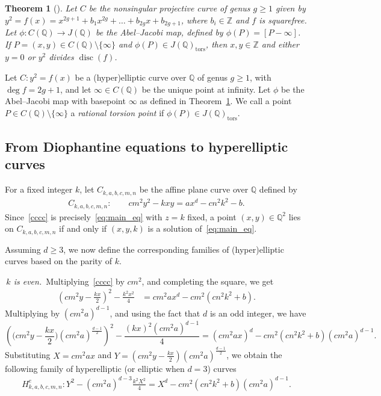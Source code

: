 \documentclass[11pt,a4paper]{amsart}
\newcommand{\ZZ}{\mathbb{Z}}
\newcommand{\Q}{\mathbb{Q}}
\theoremstyle{plain}
\newtheorem{theorem}{Theorem}[section]
\theoremstyle{definition}
\DeclareMathOperator{\disc}{disc}
\begin{document}
\begin{theorem}[{\cite[Theorem~3]{Grant}}] \label{thm:grant}
Let $C$ be the nonsingular projective curve of genus $g \ge 1$ given by $y^2 = f(x) = x^{2g+1} + b_1 x^{2g} + \dots + b_{2g} x + b_{2g+1}$, where $b_i \in \ZZ$ and $f$ is squarefree. Let
$\phi \colon C(\Q) \rightarrow J(\Q)$ be the Abel--Jacobi map, defined by $\phi(P) = [P - \infty]$. If $P = (x,y) \in C(\Q) \setminus \{\infty\}$ and
$\phi(P) \in J(\Q)_{\mathrm{tors}}$, then $x, y \in \ZZ$ and either $y = 0$ or $y^2$ divides $\disc(f)$. 
\end{theorem}

Let $C\colon y^2 = f(x)$ be a (hyper)elliptic curve over $\Q$ of genus $g \ge 1$, with $\deg f = 2g+1$, and let $\infty \in C(\Q)$ be the unique point at infinity. Let $\phi$ be the Abel--Jacobi map with basepoint $\infty$ as defined in Theorem~\ref{thm:grant}. We call a point $P \in C(\Q) \setminus \{\infty\}$ a \textit{rational torsion point} if $\phi(P) \in J(\Q)_{\mathrm{tors}}$. 

\subsection{From Diophantine equations to hyperelliptic curves}
For a fixed integer $k$, let $C_{k,a,b,c,m,n}$ be the affine plane
curve over $\Q$ defined by
\begin{align}\label{cccc}
  C_{k,a,b,c,m,n}:\qquad cm^2y^2 - kxy = ax^d - cn^2k^2 - b.
\end{align}
Since~\eqref{cccc} is precisely~\eqref{eq:main_eq} with $z=k$ fixed, a point $(x,y)\in\Q^2$ lies on $C_{k,a,b,c,m,n}$ if and only if $(x,y,k)$ is a solution of~\eqref{eq:main_eq}.


Assuming $d\ge3$, we now define the corresponding families of (hyper)elliptic curves based on the parity of $k$.

 \,\textit{$k$ is even.}\, 
 Multiplying~\eqref{cccc} by $cm^2$, and completing the square, we get    
 \begin{align*}
    \left(cm^2y - \frac{kx}{2}\right)^2 - \frac{k^2x^2}{4} &= cm^2ax^d - cm^2(cn^2k^2 + b).
\end{align*}
Multiplying by $(cm^2a)^{d-1}$, and using the fact that $d$ is an odd integer, we have
\begin{equation*}
    \left(\Big(cm^2y - \frac{kx}{2}\Big)(cm^2a)^{\frac{d-1}{2}}\right)^2 - \frac{(kx)^2(cm^2a)^{d-1}}{4} = (cm^2ax)^d - cm^2(cn^2k^2 + b)(cm^2a)^{d-1}.
\end{equation*}
Substituting $X = cm^2ax$ and $Y = \left(cm^2y - \frac{kx}{2}\right)(cm^2a)^{\frac{d-1}{2}}$, we obtain the following family of hyperelliptic (or elliptic when $d=3$) curves
\begin{align}\label{Hyperelliptic even}
    H_{k,a,b,c,m,n}^e : Y^2 - (cm^2a)^{d-3}\frac{k^2X^2}{4} = X^d - cm^2(cn^2k^2 + b)(cm^2a)^{d-1}.
\end{align}
    
\end{document}
